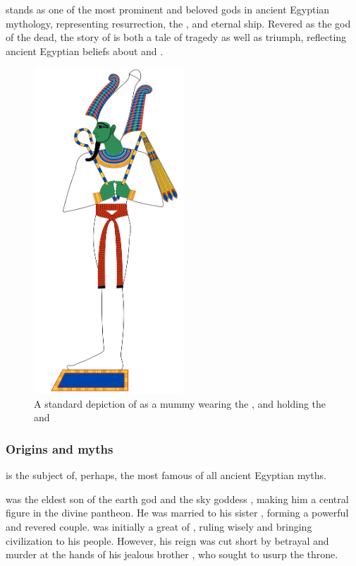  stands as one of the most prominent and beloved gods in ancient Egyptian mythology, representing resurrection, the , and eternal ship. Revered as the god of the dead, the story of  is both a tale of tragedy as well as triumph, reflecting ancient Egyptian beliefs about  and .

\begin{figure} [H]
	\centering
	\includegraphics[width=0.5\textwidth]{../images/osiris}
	\caption{A standard depiction of  as a mummy wearing the  , and holding the  and }
\end{figure}

\subsubsection*{Origins and myths}

 is the subject of, perhaps, the most famous of all ancient Egyptian myths.

 was the eldest son of the earth god  and the sky goddess , making him a central figure in the divine pantheon. He was married to his sister , forming a powerful and revered couple.  was initially a great  of , ruling wisely and bringing civilization to his people. However, his reign was cut short by betrayal and murder at the hands of his jealous brother , who sought to usurp the throne.

